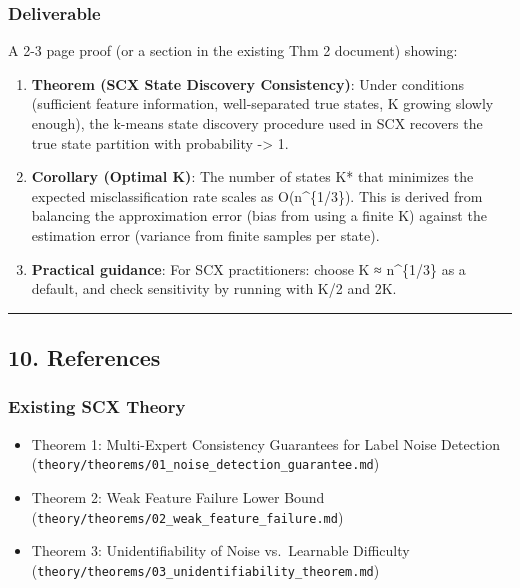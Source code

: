 \documentclass[
  12pt,
]{article}
\providecommand{\tightlist}{%
  \setlength{\itemsep}{0pt}\setlength{\parskip}{0pt}}
\begin{document}
\subsubsection{Deliverable}\label{deliverable}

A 2-3 page proof (or a section in the existing Thm 2 document) showing:

\begin{enumerate}
\def\labelenumi{\arabic{enumi}.}
\item
  \textbf{Theorem (SCX State Discovery Consistency)}: Under conditions
  (sufficient feature information, well-separated true states, K growing
  slowly enough), the k-means state discovery procedure used in SCX
  recovers the true state partition with probability -\textgreater{} 1.
\item
  \textbf{Corollary (Optimal K)}: The number of states K* that minimizes
  the expected misclassification rate scales as O(n\^{}\{1/3\}). This is
  derived from balancing the approximation error (bias from using a
  finite K) against the estimation error (variance from finite samples
  per state).
\item
  \textbf{Practical guidance}: For SCX practitioners: choose K ≈
  n\^{}\{1/3\} as a default, and check sensitivity by running with K/2
  and 2K.
\end{enumerate}

\begin{center}\rule{0.5\linewidth}{0.5pt}\end{center}

\subsection{10. References}\label{references}

\subsubsection{Existing SCX Theory}\label{existing-scx-theory}

\begin{itemize}
\tightlist
\item
  Theorem 1: Multi-Expert Consistency Guarantees for Label Noise
  Detection
  (\texttt{theory/theorems/01\_noise\_detection\_guarantee.md})
\item
  Theorem 2: Weak Feature Failure Lower Bound
  (\texttt{theory/theorems/02\_weak\_feature\_failure.md})
\item
  Theorem 3: Unidentifiability of Noise vs.~Learnable Difficulty
  (\texttt{theory/theorems/03\_unidentifiability\_theorem.md})
\end{itemize}
\end{document}
